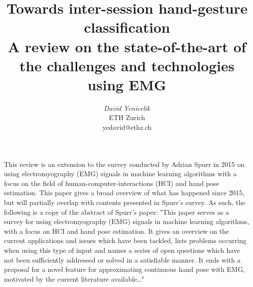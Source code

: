 \documentclass{article}
\begin{document}

\toappear{}

\title{Towards inter-session hand-gesture classification\\
	   \small{A review on the state-of-the-art of the challenges and technologies using EMG\\}
}


\author{
\parbox[t]{9cm}{\centering
	     {\em David Yenicelik}\\
	     ETH Zurich\\             
	     yedavid@ethz.ch}
}

\maketitle

\abstract
This review is an extension to the survey conducted by Adrian 
Spurr in 2015 \cite{Spurr} on using electromyography (EMG) 
signals in machine learning algorithms with a focus on the field of human-computer-interactions (HCI) and 
hand pose estimation. This paper gives a broad overview 
of what has happened since 2015, but will partially overlap 
with contents presented in Spurr's survey. As such, the 
following is a copy of the abstract of Spurr's paper:
"This paper serves as a survey for using electromyography (EMG) signals in machine learning algorithms, with a focus on HCI and hand pose estimation. It gives an overview on the current applications and issues which have been tackled, lists problems occurring when using this type of input and names a series of open questions which have not been sufficiently addressed or solved in a satisfiable manner. It ends with a proposal for a novel feature for approximating continuous hand pose with EMG, motivated by the current literature available\ldots"
\end{document}
